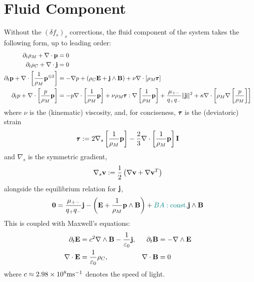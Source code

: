 \chapter{Fluid Component}

     Without the $(\delta f_{s})_{s}$ corrections, the fluid component of the system takes the following form, up to leading order: 
    {\small \begin{align}
        \partial_{t}\rho_{M} + \nabla\cdot\mathbf{p}  &=  0  \\
        \partial_{t}\rho_{C} + \nabla\cdot\mathbf{j}  &=  0  \\
        \partial_{t}\mathbf{p} + \nabla\cdot\left[\frac{1}{\rho_{M}}\mathbf{p}^{\otimes 2}\right]  &=  - \nabla p + (\rho_{C}\mathbf{E} + \mathbf{j}\wedge\mathbf{B}) + \nu\nabla\cdot[\rho_{M}\pmb{\mathsf{\tau}}]  \\
        \partial_{t}p + \nabla\cdot\left[\frac{p}{\rho_{M}}\mathbf{p}\right]  &=  - p\nabla\cdot\left[\frac{1}{\rho_{M}}\mathbf{p}\right] + \nu\rho_{M}\pmb{\mathsf{\tau}}:\nabla\left[\frac{1}{\rho_{M}}\mathbf{p}\right] + \frac{\mu_{+-}}{q_{+}q_{-}}\|\mathbf{j}\|^{2} + \kappa\nabla\cdot\left[\rho_{M}\nabla\left[\frac{p}{\rho_{M}}\right]\right]
    \end{align}}
    where $\nu$ is the (kinematic) viscosity, and, for conciseness, $\pmb{\mathsf{\tau}}$ is the (deviatoric) strain
    \begin{equation}\label{eqn:strain equation}
        \pmb{\mathsf{\tau}}  :=  2\nabla_{s}\left[\frac{1}{\rho_{M}}\mathbf{p}\right] - \frac{2}{3}\nabla\cdot\left[\frac{1}{\rho_{M}}\mathbf{p}\right]\mathbf{I}
    \end{equation}
    and $\nabla_{s}$ is the symmetric gradient,
    \begin{equation}
        \nabla_{s}\mathbf{v}  :=  \frac{1}{2}\left(\nabla\mathbf{v} + \nabla\mathbf{v}^{T}\right)
    \end{equation}
    alongside the equilibrium relation for $\mathbf{j}$,
    \begin{equation}
        \mathbf{0}  =  \frac{\mu_{+-}}{q_{+}q_{-}}\mathbf{j} - \left(\mathbf{E} + \frac{1}{\rho_{M}}\mathbf{p}\wedge\mathbf{B}\right) + \textcolor{teal}{BA: \rm const.}\mathbf{j}\wedge\mathbf{B}
    \end{equation}
    This is coupled with Maxwell's equations:
    \begin{align*}
        \partial_{t}\mathbf{E}  &=  c^{2}\nabla\wedge\mathbf{B} - \frac{1}{\varepsilon_{0}}\mathbf{j},  &
        \partial_{t}\mathbf{B}  &=  - \nabla\wedge\mathbf{E}  \\
        \nabla\cdot\mathbf{E}  &=  \frac{1}{\varepsilon_{0}}\rho_{C},  &
        \nabla\cdot\mathbf{B}  &=  0
    \end{align*}
    where $c \approx 2.98\times 10^{8}\mathrm{m}\mathrm{s}^{- 1}$ denotes the speed of light.

